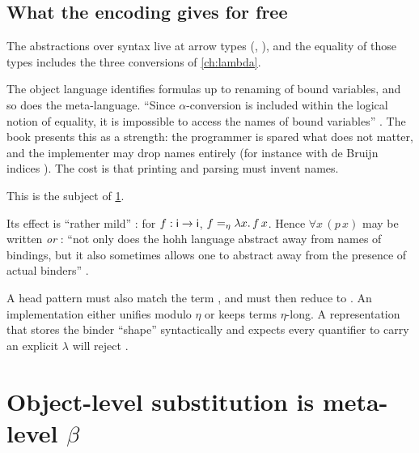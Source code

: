 {{\subsection{What the encoding gives for free}\label{sec:lambdatree-properties}

The abstractions over syntax live at arrow types (, ), and the equality of
those types includes the three conversions of \cref{ch:lambda}.
\begin{description}[nosep,font=\normalfont\itshape]
  \item[$\alpha$.] The object language identifies formulas up to renaming of bound variables, and so does
        the meta-language. \enquote{Since $\alpha$-conversion is included within the logical notion of equality,
        it is impossible to access the names of bound variables} . The book presents this as a
        strength: the programmer is spared what does not matter, and the implementer may drop names entirely
        (for instance with de Bruijn indices \cite{deBruijn1972}). The cost is that printing and parsing must
        invent names.
  \item[$\beta$.] This is the subject of \cref{sec:lambdatree-beta}.
  \item[$\eta$.] Its effect is \enquote{rather mild} : for $f:\mathsf{i}\to\mathsf{i}$,
        $f=_\eta\lambda x.\,f\,x$. Hence $\forall x\,(p\,x)$ may be written  \emph{or}
        : \enquote{not only does the hohh language abstract away from names of bindings, but it also
        sometimes allows one to abstract away from the presence of actual binders} .
\end{description}

\begin{pitfall}
A head pattern  must also match the term , and  must then reduce to
. An implementation either unifies modulo $\eta$ or keeps terms $\eta$-long. A representation that
stores the binder \enquote{shape} syntactically and expects every quantifier to carry an explicit
$\lambda$ will reject .
\end{pitfall}

\section{Object-level substitution is meta-level \texorpdfstring{$\beta$}{β}}\label{sec:lambdatree-beta}

}}
